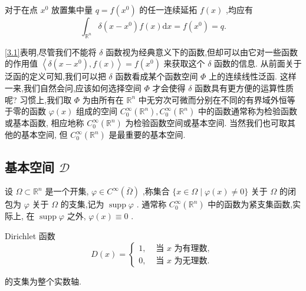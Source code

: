 \documentclass[lang=cn,newtx,10pt,scheme=chinese,thmcnt=chapter]{elegantbook}
\newcommand{\dif}{\mathrm{d}}
\begin{document}
对于在点 \({x}^{0}\) 放置集中量 \(q = f\left( {x}^{0}\right)\) 的任一连续延拓 \(f\left( x\right)\) ,均应有
\begin{equation}
  {\int }_{{\mathbb{R}}^{n}}\delta \left( {x - {x}^{0}}\right) f\left( x\right) {\dif x} = f\left( {x}^{0}\right)  = q. \label{3.1}
\end{equation}

\ref{3.1}表明,尽管我们不能将 \(\delta\) 函数视为经典意义下的函数,但却可以由它对一些函数的作用值 \(\left\langle  {\delta \left( {x - {x}^{0}}\right) ,f\left( x\right) }\right\rangle   = f\left( {x}^{0}\right)\) 来获取这个 \(\delta\) 函数的信息. 从前面关于泛函的定义可知,我们可以把 \(\delta\) 函数看成某个函数空间 \(\Phi\) 上的连续线性泛函. 这样一来,我们自然会问,应该如何选择空间 \(\Phi\) 才会使得 \(\delta\) 函数具有更方便的运算性质呢? 习惯上,我们取 \(\Phi\) 为由所有在 \({\mathbb{R}}^{n}\) 中无穷次可微而分别在不同的有界域外恒等于零的函数 \(\varphi \left( x\right)\) 组成的空间 \({C}_{0}^{\infty }\left( {\mathbb{R}}^{n}\right) ,{C}_{0}^{\infty }\left( {\mathbb{R}}^{n}\right)\) 中的函数通常称为检验函数或基本函数, 相应地称 \({C}_{0}^{\infty }\left( {\mathbb{R}}^{n}\right)\) 为检验函数空间或基本空间. 当然我们也可取其他的基本空间, 但 \({C}_{0}^{\infty }\left( {\mathbb{R}}^{n}\right)\) 是最重要的基本空间.

\subsection{基本空间 \(\mathcal{D}\)}
设 \(\Omega  \subset  {\mathbb{R}}^{n}\) 是一个开集, \(\varphi  \in  {C}^{\infty }\left( \bar{\Omega }\right)\) ,称集合 \(\{ x \in  \Omega  \mid  \varphi \left( x\right)  \neq  0\}\) 关于 \(\Omega\) 的闭包为 \(\varphi\) 关于 \(\Omega\) 的支集,记为 \(\operatorname{supp}\varphi\) . 通常称 \({C}_{0}^{\infty }\left( {\mathbb{R}}^{n}\right)\) 中的函数为紧支集函数,实际上, 在 \(\operatorname{supp}\varphi\) 之外, \(\varphi \left( x\right)  \equiv  0\) .
\begin{example}
  Dirichlet 函数
\begin{equation*}
D\left( x\right)  = \left\{  \begin{array}{ll} 1, & \text{ 当 }x\text{ 为有理数, } \\  0, & \text{ 当 }x\text{ 为无理数. } \end{array}\right.
\end{equation*}

的支集为整个实数轴.

\end{example}
\end{document}
